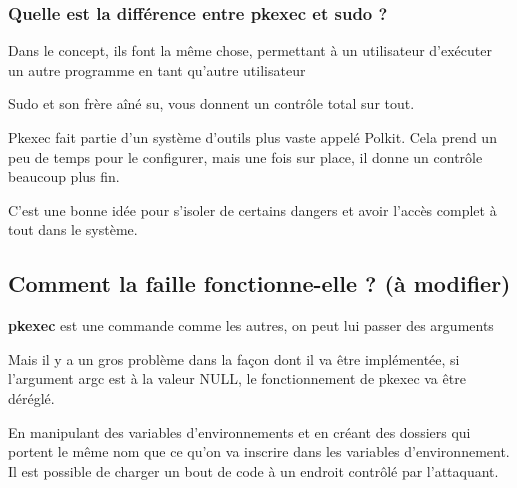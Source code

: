 \documentclass[12pt,a4paper]{article}
\begin{document}
\begin{flushleft}
\begin{flushleft}
                \subsubsection{Quelle est la différence entre pkexec et sudo ?}
                \begin{flushleft}
                    \noindent Dans le concept, ils font la même chose, permettant à un utilisateur d'exécuter un autre programme en tant qu'autre utilisateur
                    \item Sudo et son frère aîné su, vous donnent un contrôle total sur tout.
                    \item Pkexec fait partie d'un système d'outils plus vaste appelé Polkit. Cela prend un peu de temps pour le configurer, mais une fois sur place, il donne un contrôle beaucoup plus fin.
                    \item C'est une bonne idée pour s'isoler de certains dangers et avoir l'accès complet à tout dans le système.
                \end{flushleft}
            
            \end{flushleft}
   		\end{flushleft}
   		\subsection{Comment la faille fonctionne-elle ? (à modifier) }
   		\begin{flushleft}
   			\noindent \textbf{pkexec} est une commande comme les autres, on peut lui passer des arguments
   			\item Mais il y a un gros problème dans la façon dont il va être implémentée, si l'argument argc est à la valeur NULL, le fonctionnement de pkexec va être déréglé. 
   			\item En manipulant des variables d'environnements et en créant des dossiers qui portent le même nom que ce qu'on va inscrire dans les variables d'environnement. Il est possible de charger un bout de code à un endroit contrôlé par l'attaquant. 
   		\end{flushleft}
   		
\end{document}
